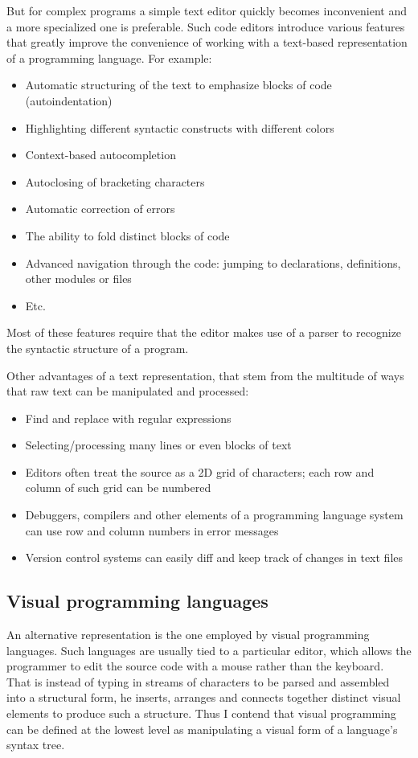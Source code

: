 But for complex programs a simple text editor quickly becomes inconvenient and a
more specialized one is preferable. Such code editors introduce various features
that greatly improve the convenience of working with a text-based representation
of a programming language. For example:
\begin{itemize}
	\item Automatic structuring of the text to emphasize blocks of code
          (autoindentation)
	\item Highlighting different syntactic constructs with different colors
	\item Context-based autocompletion
	\item Autoclosing of bracketing characters
	\item Automatic correction of errors
	\item The ability to fold distinct blocks of code
	\item Advanced navigation through the code: jumping to declarations,
          definitions, other modules or files
	\item Etc.
\end{itemize}
Most of these features require that the editor makes use of a parser to
recognize the syntactic structure of a program.

Other advantages of a text representation, that stem from the multitude of ways
that raw text can be manipulated and processed:
\begin{itemize}
	\item Find and replace with regular expressions
	\item Selecting/processing many lines or even blocks of text
	\item Editors often treat the source as a 2D grid of characters; each
          row and column of such grid can be numbered
	\item Debuggers, compilers and other elements of a programming language
          system can use row and column numbers in error messages
	\item Version control systems can easily diff and keep track of changes
          in text files
\end{itemize}


\subsection{Visual programming languages}
An alternative representation is the one employed by visual programming
languages. Such languages are usually tied to a particular editor, which allows
the programmer to edit the source code with a mouse rather than the
keyboard. That is instead of typing in streams of characters to be parsed and
assembled into a structural form, he inserts, arranges and connects together
distinct visual elements to produce such a structure. Thus I contend that visual
programming can be defined at the lowest level as manipulating a visual form of
a language's syntax tree.

